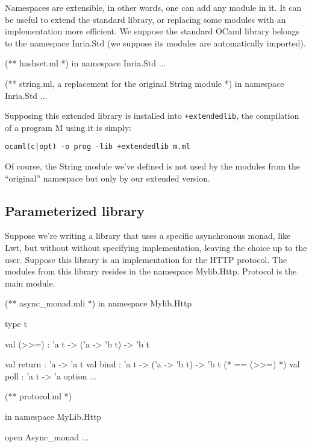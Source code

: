Namespaces are extensible, in other words, one can add any module in it. It can
be useful to extend the standard library, or replacing some modules with an
implementation more efficient. We suppose the standard OCaml library belongs to
the namespace Inria.Std (we suppose its modules are automatically
imported).

\begin{OCaml}
(** hashset.ml *)
in namespace Inria.Std
...
\end{OCaml}

\begin{OCaml}
(** string.ml, a replacement for the original String module *)
in namespace Inria.Std
...
\end{OCaml}

Supposing this extended library is installed into \texttt{+extendedlib}, the
compilation of a program M using it is simply:
\begin{verbatim}
ocaml(c|opt) -o prog -lib +extendedlib m.ml
\end{verbatim}

Of course, the String module we've defined is not used by the modules from the
``original'' namespace but only by our extended version.

\subsection{Parameterized library}

Suppose we're writing a library that uses a specific asynchronous monad, like
Lwt, but without without specifying implementation, leaving the choice up to the
user. Suppose this library is an implementation for the HTTP protocol. The modules
from this library resides in the namespace Mylib.Http. Protocol is the main module.

\begin{OCaml}
(** async_monad.mli *)
in namespace Mylib.Http

type t

val (>>=) : 'a t -> ('a -> 'b t) -> 'b t

val return : 'a -> 'a t
val bind : 'a t -> ('a -> 'b t) -> 'b t (* == (>>=) *)
val poll : 'a t -> 'a option
...
\end{OCaml}

\medskip

\begin{OCaml}
(** protocol.ml *)

in namespace MyLib.Http

open Async_monad
...
\end{OCaml}

